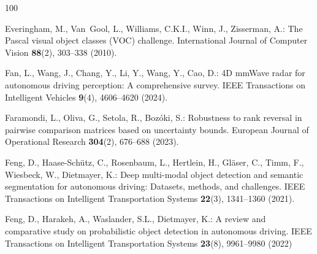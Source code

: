 \documentclass[graybox,envcountchap]{style/SNmono}
\begin{document}
\begin{thebibliography}{100}
{\par}

Everingham, M., Van~Gool, L., Williams, C.K.I., Winn, J., Zisserman, A.: The
  {P}ascal visual object classes ({VOC}) challenge.
\newblock International Journal of Computer Vision \textbf{88}(2), 303--338
  (2010).
\newblock {}



Fan, L., Wang, J., Chang, Y., Li, Y., Wang, Y., Cao, D.: {4D} {mmWave} radar
  for autonomous driving perception: A comprehensive survey.
\newblock IEEE Transactions on Intelligent Vehicles \textbf{9}(4), 4606--4620
  (2024).
\newblock {}



Faramondi, L., Oliva, G., Setola, R., Boz{\'o}ki, S.: Robustness to rank
  reversal in pairwise comparison matrices based on uncertainty bounds.
\newblock European Journal of Operational Research \textbf{304}(2), 676--688
  (2023).
\newblock {}



Feng, D., Haase-Sch{\"u}tz, C., Rosenbaum, L., Hertlein, H., Gl{\"a}ser, C.,
  Timm, F., Wiesbeck, W., Dietmayer, K.: Deep multi-modal object detection and
  semantic segmentation for autonomous driving: Datasets, methods, and
  challenges.
\newblock IEEE Transactions on Intelligent Transportation Systems
  \textbf{22}(3), 1341--1360 (2021).
\newblock {}


{\color{red} 
Feng, D., Harakeh, A., Waslander, S.L., Dietmayer, K.: A review and comparative
  study on probabilistic object detection in autonomous driving.
\newblock IEEE Transactions on Intelligent Transportation Systems
  \textbf{23}(8), 9961--9980 (2022)

\par}
\end{thebibliography}
\end{document}
